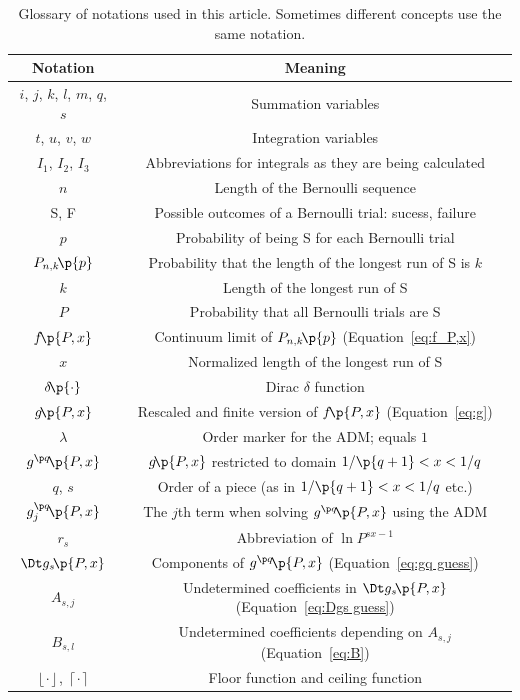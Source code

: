 \documentclass[oneside,12pt,final]{ucthesis-CA2012}
\newcommand{\dlt}{\delta}
\newcommand{\lmd}{\lambda}
\newcommand{\fc}[2]{#1\mathchoice{\!}{\!}{}{}\p{#2}} %
\newcommand\floor[1]{\left\lfloor#1\right\rfloor}
\newcommand\ceil[1]{\left\lceil#1\right\rceil}
\begin{document}
\begin{mainmatter}
\begin{longtable}[h!]{cc}
	\caption{Glossary of notations used in this article.
	Sometimes different concepts use the same notation.}
	\label{tab:notation}\\
	\toprule
	Notation & Meaning \\
	\midrule
	$i$, $j$, $k$, $l$, $m$, $q$, $s$ & Summation variables \\
	$t$, $u$, $v$, $w$ & Integration variables \\
	$I_1$, $I_2$, $I_3$ & Abbreviations for integrals as they are being calculated \\
	$n$ & Length of the Bernoulli sequence \\
	S, F & Possible outcomes of a Bernoulli trial: sucess, failure \\
	$p$ & Probability of being S for each Bernoulli trial \\
	$\fc{P_{n,k}}p$ & Probability that the length of the longest run of S is $k$ \\
	$k$ & Length of the longest run of S \\
	$P$ & Probability that all Bernoulli trials are S \\
	$\fc f{P,x}$ & Continuum limit of $\fc{P_{n,k}}p$ (Equation~\ref{eq:f_P,x}) \\
	$x$ & Normalized length of the longest run of S \\
	$\fc\dlt\cdot$ & Dirac $\dlt$ function \\
	$\fc g{P,x}$ & Rescaled and finite version of $\fc f{P,x}$ (Equation~\ref{eq:g}) \\
	$\lmd$ & Order marker for the ADM; equals $1$ \\
	$\fc{g^{\p q}}{P,x}$ & $\fc g{P,x}$ restricted to domain $1/\p{q+1}<x<1/q$ \\
	$q$, $s$ & Order of a piece (as in $1/\p{q+1}<x<1/q$ etc.) \\
	$\fc{g^{\p q}_j}{P,x}$ & The $j$th term when solving $\fc{g^{\p q}}{P,x}$ using the ADM \\
	$r_s$ & Abbreviation of $\ln P^{sx-1}$ \\
	$\fc{\Dt g_s}{P,x}$ & Components of $\fc{g^{\p q}}{P,x}$ (Equation~\ref{eq:gq guess}) \\
	$A_{s,j}$ & Undetermined coefficients in $\fc{\Dt g_s}{P,x}$ (Equation~\ref{eq:Dgs guess}) \\
	$B_{s,l}$ & Undetermined coefficients depending on $A_{s,j}$ (Equation~\ref{eq:B}) \\
	$\floor\cdot$, $\ceil\cdot$ & Floor function and ceiling function \\

\end{longtable}
\end{mainmatter}
\end{document}
